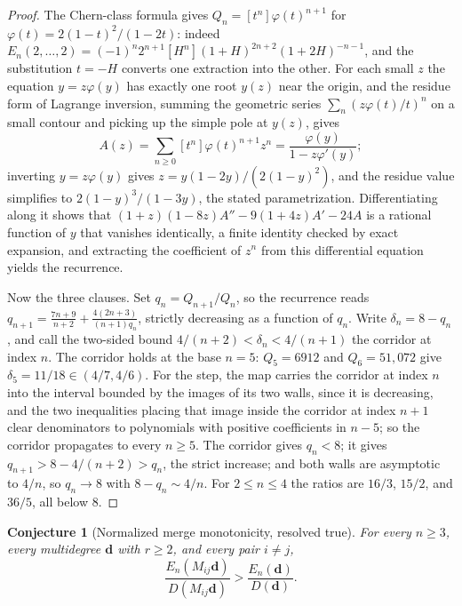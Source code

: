 \documentclass[11pt]{article}
\newtheorem{conjecture}{Conjecture}
\theoremstyle{definition}
\begin{document}
\begin{proof}
The Chern-class formula gives $Q_n=[t^n]\varphi(t)^{n+1}$ for $\varphi(t)=2(1-t)^2/(1-2t)$: indeed $E_n(2,\ldots,2)=(-1)^n2^{n+1}[H^n](1+H)^{2n+2}(1+2H)^{-n-1}$, and the substitution $t=-H$ converts one extraction into the other.  For each small $z$ the equation $y=z\varphi(y)$ has exactly one root $y(z)$ near the origin, and the residue form of Lagrange inversion, summing the geometric series $\sum_n(z\varphi(t)/t)^n$ on a small contour and picking up the simple pole at $y(z)$, gives
\[
A(z)=\sum_{n\ge0}[t^n]\varphi(t)^{n+1}z^n=\frac{\varphi(y)}{1-z\varphi'(y)};
\]
inverting $y=z\varphi(y)$ gives $z=y(1-2y)/(2(1-y)^2)$, and the residue value simplifies to $2(1-y)^3/(1-3y)$, the stated parametrization.  Differentiating along it shows that $(1+z)(1-8z)A''-9(1+4z)A'-24A$ is a rational function of $y$ that vanishes identically, a finite identity checked by exact expansion, and extracting the coefficient of $z^n$ from this differential equation yields the recurrence.

Now the three clauses.  Set $q_n=Q_{n+1}/Q_n$, so the recurrence reads $q_{n+1}=\tfrac{7n+9}{n+2}+\tfrac{4(2n+3)}{(n+1)q_n}$, strictly decreasing as a function of $q_n$.  Write $\delta_n=8-q_n$, and call the two-sided bound $4/(n+2)<\delta_n<4/(n+1)$ the corridor at index $n$.  The corridor holds at the base $n=5$: $Q_5=6912$ and $Q_6=51{,}072$ give $\delta_5=11/18\in(4/7,4/6)$.  For the step, the map carries the corridor at index $n$ into the interval bounded by the images of its two walls, since it is decreasing, and the two inequalities placing that image inside the corridor at index $n+1$ clear denominators to polynomials with positive coefficients in $n-5$; so the corridor propagates to every $n\ge5$.  The corridor gives $q_n<8$; it gives $q_{n+1}>8-4/(n+2)>q_n$, the strict increase; and both walls are asymptotic to $4/n$, so $q_n\to8$ with $8-q_n\sim4/n$.  For $2\le n\le4$ the ratios are $16/3$, $15/2$, and $36/5$, all below $8$.
\end{proof}

\begin{conjecture}[Normalized merge monotonicity, resolved true]\label{x2}
For every $n\ge3$, every multidegree $\mathbf d$ with $r\ge2$, and every pair $i\ne j$,
\[
\frac{E_n(M_{ij}\mathbf d)}{D(M_{ij}\mathbf d)}>\frac{E_n(\mathbf d)}{D(\mathbf d)}.
\]
\end{conjecture}
\end{document}
